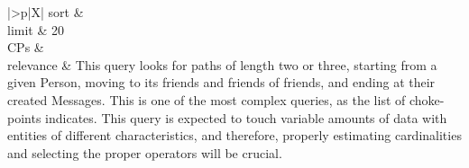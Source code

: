 \begin{tabularx}{\queryCardWidth}{|>{\queryPropertyCell}p{\queryPropertyCellWidth}|X|}
		sort		&
		\innerCardVSpace \\ \hline
	limit & 20 \\ \hline
	CPs &
	 \\ \hline
	relevance &
		\footnotesize This query looks for paths of length two or three, starting from a given Person, moving to its friends and friends of
friends, and ending at their created Messages. This is one of the most complex queries, as the list of choke-points
indicates. This query is expected to touch variable amounts of data with entities of different characteristics, and
therefore, properly estimating cardinalities and selecting the proper operators will be crucial.
 \\ \hline%
\end{tabularx}
\queryCardVSpace

\let\emph\oldemph
